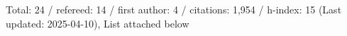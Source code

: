 Total: 24 / refereed: 14 / first author: 4 / citations: 1,954 / h-index: 15 (Last updated: 2025-04-10), List attached below